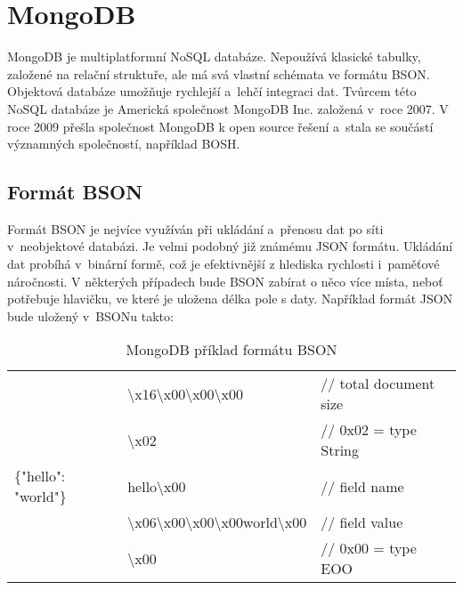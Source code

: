 \section {MongoDB}
\par MongoDB\cite{mongodb} je multiplatformní NoSQL databáze. Nepoužívá klasické tabulky, založené na relační struktuře, ale má svá vlastní schémata ve formátu BSON\cite{mongogbinc}. Objektová databáze umožňuje rychlejší a~lehčí integraci dat. Tvůrcem této NoSQL databáze je Americká společnost MongoDB Inc.\cite{mongodb} založená v~roce 2007. V roce 2009 přešla společnost MongoDB\cite{mongodb} k open source řešení a~stala se součástí významných společností, například BOSH.
\subsection {Formát BSON}
\par Formát BSON\cite{mongogbinc} je nejvíce využíván při ukládání a~přenosu dat po síti v~neobjektové databázi. Je velmi podobný již známému JSON formátu. Ukládání dat probíhá v~binární formě, což je efektivnější z hlediska rychlosti i~paměťové náročnosti. V některých případech bude BSON zabírat o něco více místa, neboť potřebuje hlavičku, ve které je uložena délka pole s daty.
Například formát JSON bude uložený v~BSON\cite{mongogbinc}u takto: 

\begin{table}[h]
\begin{tabulary}{\textwidth} {| l | l | l |}
 						& \textbackslash{x}16\textbackslash{x}00\textbackslash{x}00\textbackslash{x}00 								&// total document size \\
 						& \textbackslash{x}02 																						&// 0x02 = type String\\
\{"hello": "world"\} 	& hello\textbackslash{x}00 																					&// field name\\
 						& \textbackslash{x}06\textbackslash{x}00\textbackslash{x}00\textbackslash{x}00world\textbackslash{x}00 		&// field value\\
 						& \textbackslash{x}00 																						&// 0x00 = type EOO \\
\end{tabulary}
\caption[MongoDB příklad formátu BSON]{MongoDB příklad formátu BSON}\label{tab:bson}
\end{table}
\vfill